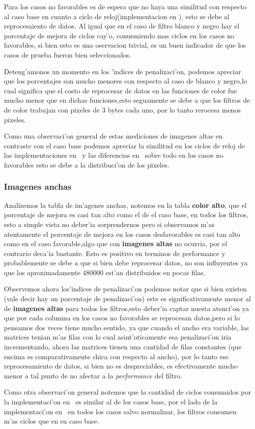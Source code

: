 Para los casos no favorables es de espera que no haya una similitud con respecto al caso base en cuanto a ciclo de 
reloj(implementacion en \ass ), esto se debe al reprocesaiento de datos. Al igual que en el caso de filtro blanco y negro
hay el porcentaje de mejora de ciclos cay'o, conusmiendo mas ciclos en los casos no favorables, si bien esto es una 
oservacion trivial, es un buen indicador de que los casos de prueba fueron bien seleccionados.

Deteng'amonos un momento en los 'indices de penalizaci'on, podemos apreciar que los porcentajes son mucho 
menores con respecto al caso de blanco y negro,lo cual significa que el costo de reprocesar de datos en
las funciones de color fue mucho menor que en dichas funciones,esto seguamente se debe a que los filtros de de color
trabajan con pixeles de 3 bytes cada uno, por lo tanto rerocesa menos pixeles.

Como una observaci'on general de estas mediciones de imagenes altas en contraste con el caso base podemos apreciar la 
similitud en los ciclos de reloj de las implementaciones en \C \ y las diferencias en \ass \ sobre todo en los 
casos no favorables esto se debe a la distribuci'on de los pixeles.

\subsubsection{Imagenes anchas}
Analizemos la tabla de im'agenes anchas, notemos en la tabla \textbf{color alto}, que el porcentaje de mejora es
casi tan alto como el de el caso base, en todos los filtros, esto a simple vista no deber'ia
 sorprendernos pero si observamos m'as atentamente el porcentaje de mejora en los casos desfavorables es 
casi tan alto como en el caso favorable,algo que con \textbf{imagenes altas} no ocurria, por el contrario
deca'ia bastante. Esto es positivo en terminos de performance y probablemente se debe a que si bien
debe reprocesar datos, no son influyentes ya que los aproximadamente 480000 est'an distribuidos en
pocas filas.

Observemos ahora los'indices de penalizaci'on podemos notar que si bien existen (vale decir hay un porcentaje
 de penalizaci'on) este es significativamente menor al de \textbf{imagenes altas} para todos los filtros,esto
deber'ia captar nuesta atenci'on ya que por cada columna en los casos no favorables se reprocesan datos,pero
si lo pensamos dos veces tiene mucho sentido, ya que cuando el ancho era variable, las matrices
tenian m'as filas con lo cual asint'oticamente esa penalizaci'on iria incrementando, ahora las matrices
tienen una cantidad de filas constantes (que encima es comparativamente chica con respecto al ancho),
por lo tanto ese reprocesamiento de datos, si bien no es despreciables, es efectivamente mucho menor
a tal punto de no afectar a la \textit{performance} del filtro.

Como otra observaci'on general notemos que la cantidad de ciclos consumidos por la implementaci'on en \C \ es
similar al de los casos base, por el lado de la implementaci'on en \ass \ en todos los casos salvo normalizar,
los filtros consumen m'as ciclos que en su caso base.
